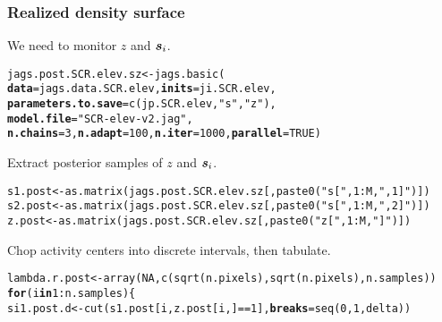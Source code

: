 \documentclass[color=usenames,dvipsnames]{beamer}\usepackage[]{graphicx}\usepackage[]{color}
\makeatletter
\newcommand{\hlnum}[1]{\textcolor[rgb]{0.69,0.494,0}{#1}}%
\newcommand{\hlstr}[1]{\textcolor[rgb]{0.749,0.012,0.012}{#1}}%
\newcommand{\hlopt}[1]{\textcolor[rgb]{0,0,0}{#1}}%
\newcommand{\hlstd}[1]{\textcolor[rgb]{0,0,0}{#1}}%
\newcommand{\hlkwa}[1]{\textcolor[rgb]{0,0,0}{\textbf{#1}}}%
\newcommand{\hlkwb}[1]{\textcolor[rgb]{0,0.341,0.682}{#1}}%
\newcommand{\hlkwc}[1]{\textcolor[rgb]{0,0,0}{\textbf{#1}}}%
\newcommand{\hlkwd}[1]{\textcolor[rgb]{0.004,0.004,0.506}{#1}}%
\newenvironment{kframe}{%
 \def\at@end@of@kframe{}%
 \ifinner\ifhmode%
  \def\at@end@of@kframe{\end{minipage}}%
  \begin{minipage}{\columnwidth}%
 \fi\fi%
 \def\FrameCommand##1{\hskip\@totalleftmargin \hskip-\fboxsep
 \colorbox{shadecolor}{##1}\hskip-\fboxsep
     \hskip-\linewidth \hskip-\@totalleftmargin \hskip\columnwidth}%
 \MakeFramed {\advance\hsize-\width
   \@totalleftmargin\z@ \linewidth\hsize
   \@setminipage}}%
 {\par\unskip\endMakeFramed%
 \at@end@of@kframe}
\newenvironment{knitrout}{}{} %
\makeatother
\begin{document}
\begin{frame}[fragile]
  \frametitle{Realized density surface}
  We need to monitor $z$ and ${\bm s}_i$.
\begin{knitrout}\scriptsize
{}\color{fgcolor}\begin{kframe}
\begin{alltt}
\hlstd{jags.post.SCR.elev.sz} \hlkwb{<-} \hlkwd{jags.basic}\hlstd{(}
    \hlkwc{data}\hlstd{=jags.data.SCR.elev,} \hlkwc{inits}\hlstd{=ji.SCR.elev,}
    \hlkwc{parameters.to.save}\hlstd{=}\hlkwd{c}\hlstd{(jp.SCR.elev,}\hlstr{"s"}\hlstd{,}\hlstr{"z"}\hlstd{),}
    \hlkwc{model.file}\hlstd{=}\hlstr{"SCR-elev-v2.jag"}\hlstd{,}
    \hlkwc{n.chains}\hlstd{=}\hlnum{3}\hlstd{,} \hlkwc{n.adapt}\hlstd{=}\hlnum{100}\hlstd{,} \hlkwc{n.iter}\hlstd{=}\hlnum{1000}\hlstd{,} \hlkwc{parallel}\hlstd{=}\hlnum{TRUE}\hlstd{)}
\end{alltt}
\end{kframe}
\end{knitrout}
\pause \vfill
  Extract posterior samples of $z$ and ${\bm s}_i$. 
\begin{knitrout}\scriptsize
{}\color{fgcolor}\begin{kframe}
\begin{alltt}
\hlstd{s1.post} \hlkwb{<-} \hlkwd{as.matrix}\hlstd{(jags.post.SCR.elev.sz[,}\hlkwd{paste0}\hlstd{(}\hlstr{"s["}\hlstd{,} \hlnum{1}\hlopt{:}\hlstd{M,} \hlstr{",1]"}\hlstd{)])}
\hlstd{s2.post} \hlkwb{<-} \hlkwd{as.matrix}\hlstd{(jags.post.SCR.elev.sz[,}\hlkwd{paste0}\hlstd{(}\hlstr{"s["}\hlstd{,} \hlnum{1}\hlopt{:}\hlstd{M,} \hlstr{",2]"}\hlstd{)])}
\hlstd{z.post} \hlkwb{<-} \hlkwd{as.matrix}\hlstd{(jags.post.SCR.elev.sz[,}\hlkwd{paste0}\hlstd{(}\hlstr{"z["}\hlstd{,} \hlnum{1}\hlopt{:}\hlstd{M,} \hlstr{"]"}\hlstd{)])}
\end{alltt}
\end{kframe}
\end{knitrout}
\pause \vfill
Chop activity centers into discrete intervals, then tabulate.
\begin{knitrout}\scriptsize
{}\color{fgcolor}\begin{kframe}
\begin{alltt}
\hlstd{lambda.r.post} \hlkwb{<-} \hlkwd{array}\hlstd{(}\hlnum{NA}\hlstd{,} \hlkwd{c}\hlstd{(}\hlkwd{sqrt}\hlstd{(n.pixels),} \hlkwd{sqrt}\hlstd{(n.pixels), n.samples))}
\hlkwa{for}\hlstd{(i} \hlkwa{in} \hlnum{1}\hlopt{:}\hlstd{n.samples) \{}
    \hlstd{si1.post.d} \hlkwb{<-} \hlkwd{cut}\hlstd{(s1.post[i,z.post[i,]}\hlopt{==}\hlnum{1}\hlstd{],} \hlkwc{breaks}\hlstd{=}\hlkwd{seq}\hlstd{(}\hlnum{0}\hlstd{,} \hlnum{1}\hlstd{, delta))}

\end{alltt}
\end{kframe}
\end{knitrout}
\end{frame}
\end{document}
